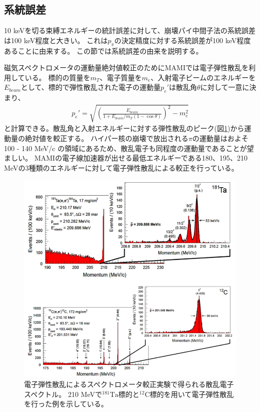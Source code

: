 \documentclass[a4paper,11pt,uplatex]{jsbook}
\begin{document}
\subsection{系統誤差}
10 keVを切る束縛エネルギーの統計誤差に対して、崩壊パイ中間子法の系統誤差は100 keV程度と大きい。
これは$p_\pi$の決定精度に対する系統誤差が100 keV程度あることに由来する。
この節では系統誤差の由来を説明する。

磁気スペクトロメータの運動量絶対値較正のためにMAMIでは電子弾性散乱を利用している。
標的の質量を$m_T$、電子質量を$m_e$、入射電子ビームのエネルギーを$E_{beam}$として、標的で弾性散乱された電子の運動量$p_e'$は散乱角$\theta$に対して一意に決まり、
\begin{eqnarray}
  p_e' = \sqrt{\left(\frac{E_{beam}}{1 + E_{beam}/m_T(1 - \cos{\theta})} \right)^2 - m_e^2}\label{elastic scattering}
\end{eqnarray}
と計算できる。散乱角と入射エネルギーに対する弾性散乱のピーク(図\ref{elastic_scat})から運動量の絶対値を較正する。
ハイパー核の崩壊で放出される$\pi$の運動量はおよそ 100 - 140 MeV/c の領域にあるため、散乱電子も同程度の運動量であることが望ましい。
MAMIの電子線加速器が出せる最低エネルギーである180、195、210 MeVの3種類のエネルギーに対して電子弾性散乱による較正を行っている。
\begin{figure}[h]
  \centering
  \includegraphics[width=0.8\linewidth]{image/1-elastic.png}
  \caption[電子弾性散乱によるスペクトロメータ較正]{電子弾性散乱によるスペクトロメータ較正実験で得られる散乱電子スペクトル。
  210 MeVで$^{181}\text{Ta}$標的と$^{12}\text{C}$標的を用いて電子弾性散乱を行った例を示している。\cite{elastic}}
  \label{elastic_scat}
\end{figure}
\end{document}
